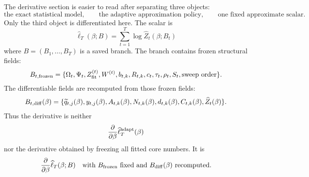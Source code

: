 \documentclass[11pt]{article}
\numberwithin{equation}{section}
\begin{document}
The derivative section is easier to read after separating three objects:
\begin{equation}
    \text{the exact statistical model},\qquad
    \text{the adaptive approximation policy},\qquad
    \text{one fixed approximate scalar}.
    \label{eq:p25-gradteach-1}
\end{equation}
Only the third object is differentiated here.  The scalar is
\begin{equation}
\boxed{
    \widehat\ell_T(\beta;B)
    =
    \sum_{t=1}^{T}\log\widehat Z_t(\beta;B_t)
}
    \label{eq:p25-gradteach-2}
\end{equation}
where \(B=(B_1,\ldots,B_T)\) is a saved branch.  The branch contains frozen
structural fields:
\begin{equation}
    B_{t,\rm frozen}
    =
    \{\Omega_t,\Psi_t,Z_{\rm fit}^{(t)},W^{(t)},b_{t,k},R_{t,k},
      c_t,\tau_t,\rho_t,S_t,\text{sweep order}\}.
    \label{eq:p25-gradteach-3}
\end{equation}
The differentiable fields are recomputed from those frozen fields:
\begin{equation}
    B_{t,\rm diff}(\beta)
    =
    \{\widetilde q_{t,j}(\beta),y_{t,j}(\beta),A_{t,k}(\beta),
      N_{t,k}(\beta),d_{t,k}(\beta),C_{t,k}(\beta),
      \widehat Z_t(\beta)\}.
    \label{eq:p25-gradteach-4}
\end{equation}
Thus the derivative is neither
\begin{equation}
    \frac{\partial}{\partial\beta}
    \widehat\ell_T^{\rm adapt}(\beta)
    \label{eq:p25-gradteach-5}
\end{equation}
nor the derivative obtained by freezing all fitted core numbers.  It is
\begin{equation}
    \frac{\partial}{\partial\beta}
    \widehat\ell_T(\beta;B)
    \quad\text{with }B_{\rm frozen}\text{ fixed and }B_{\rm diff}(\beta)
    \text{ recomputed}.
    \label{eq:p25-gradteach-6}
\end{equation}
\end{document}
